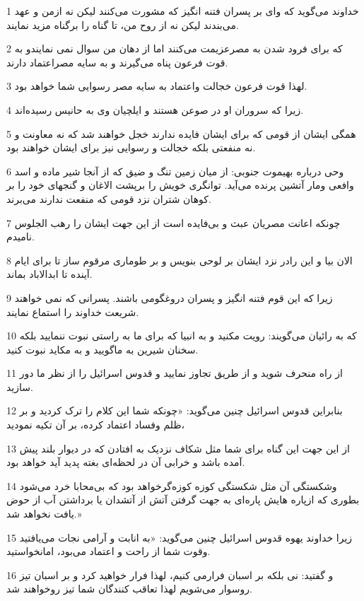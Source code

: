\par 1 خداوند می‌گوید که وای بر پسران فتنه انگیز که مشورت می‌کنند لیکن نه ازمن و عهد می‌بندند لیکن نه از روح من، تا گناه را برگناه مزید نمایند.
\par 2 که برای فرود شدن به مصرعزیمت می‌کنند اما از دهان من سوال نمی نمایندو به قوت فرعون پناه می‌گیرند و به سایه مصراعتماد دارند.
\par 3 لهذا قوت فرعون خجالت واعتماد به سایه مصر رسوایی شما خواهد بود.
\par 4 زیرا که سروران او در صوعن هستند و ایلچیان وی به حانیس رسیده‌اند.
\par 5 همگی ایشان از قومی که برای ایشان فایده ندارند خجل خواهند شد که نه معاونت و نه منفعتی بلکه خجالت و رسوایی نیز برای ایشان خواهند بود.
\par 6 وحی درباره بهیموت جنوبی: از میان زمین تنگ و ضیق که از آنجا شیر ماده و اسد وافعی ومار آتشین پرنده می‌آید. توانگری خویش را برپشت الاغان و گنجهای خود را بر کوهان شتران نزد قومی که منفعت ندارند می‌برند.
\par 7 چونکه اعانت مصریان عبث و بی‌فایده است از این جهت ایشان را رهب الجلوس نامیدم.
\par 8 الان بیا و این رادر نزد ایشان بر لوحی بنویس و بر طوماری مرقوم ساز تا برای ایام آینده تا ابدالاباد بماند.
\par 9 زیرا که این قوم فتنه انگیز و پسران دروغگومی باشند. پسرانی که نمی خواهند شریعت خداوند را استماع نمایند.
\par 10 که به رائیان می‌گویند: رویت مکنید و به انبیا که برای ما به راستی نبوت ننمایید بلکه سخنان شیرین به ماگویید و به مکاید نبوت کنید.
\par 11 از راه منحرف شوید و از طریق تجاوز نمایید و قدوس اسرائیل را از نظر ما دور سازید.
\par 12 بنابراین قدوس اسرائیل چنین می‌گوید: «چونکه شما این کلام را ترک کردید و بر ظلم وفساد اعتماد کرده، بر آن تکیه نمودید،
\par 13 از این جهت این گناه برای شما مثل شکاف نزدیک به افتادن که در دیوار بلند پیش آمده باشد و خرابی آن در لحظه‌ای بغته پدید آید خواهد بود.
\par 14 وشکستگی آن مثل شکستگی کوزه کوزه‌گرخواهد بود که بی‌محابا خرد می‌شود بطوری که ازپاره هایش پاره‌ای به جهت گرفتن آتش از آتشدان یا برداشتن آب از حوض یافت نخواهد شد.»
\par 15 زیرا خداوند یهوه قدوس اسرائیل چنین می‌گوید: «به انابت و آرامی نجات می‌یافتید وقوت شما از راحت و اعتماد می‌بود، امانخواستید.
\par 16 و گفتید: نی بلکه بر اسبان فرارمی کنیم، لهذا فرار خواهید کرد و بر اسبان تیز روسوار می‌شویم لهذا تعاقب کنندگان شما تیز روخواهند شد.
